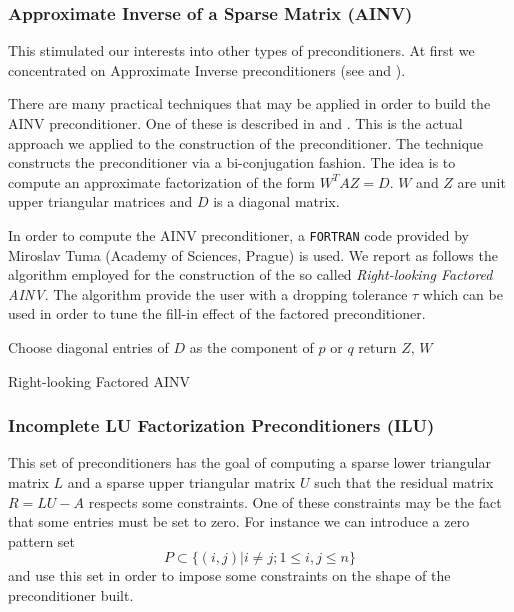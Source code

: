 \subsubsection*{Approximate Inverse of a Sparse Matrix (AINV)}

This stimulated our interests into other types of preconditioners. At first we
concentrated on Approximate Inverse preconditioners (see \cite{Saad} and
\cite{Benzi2002}).

There are many practical techniques that may be applied in order to build the
AINV preconditioner.
One of these is described in \cite{Tuma1996} and \cite{Tuma1998}.
This is the actual approach we applied to the construction of the
preconditioner. The technique constructs the preconditioner via a
bi-conjugation fashion.
The idea is to compute an approximate factorization of the form $W^T A Z=D$.
$W$ and $Z$ are unit upper triangular matrices and $D$ is a diagonal matrix.

In order to compute the AINV preconditioner, a \texttt{FORTRAN} code
provided by Miroslav Tuma (Academy of Sciences, Prague) is used.
We report as follows the algorithm employed for the construction of the so
called \textit{Right-looking Factored AINV}. The algorithm provide the user
with a dropping tolerance $\tau$ which can be used in order to tune the fill-in
effect
of the factored preconditioner. \newline

\begin{algorithm}[H]
 \;
 Choose diagonal entries of $D$ as the component of $p$ or $q$\;
 return $Z$, $W$\;
 \caption{Right-looking Factored AINV}
\end{algorithm}

\subsubsection*{Incomplete LU Factorization Preconditioners (ILU)}
This set of preconditioners has the goal of computing a sparse lower triangular
matrix $L$ and a sparse upper triangular matrix $U$ such that the residual
matrix $R=LU-A$ respects some constraints. One of these constraints may be the
fact that some entries must be set to zero.
For instance we can introduce a zero pattern set
\[
 P\subset \{(i,j)\lvert i\ne j; 1\le i,j\le n\}
\]
and use this set in order to impose some constraints on the shape of the
preconditioner built.\newline

